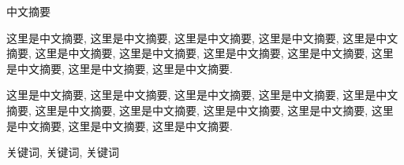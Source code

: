 \thispagestyle{plain}
{}

\centerline{\heiti 中文摘要}

\linespread{1.4} \bigskip

这里是中文摘要, 这里是中文摘要, 这里是中文摘要, 这里是中文摘要,
这里是中文摘要, 这里是中文摘要, 这里是中文摘要, 这里是中文摘要,
这里是中文摘要, 这里是中文摘要, 这里是中文摘要, 这里是中文摘要.

这里是中文摘要, 这里是中文摘要, 这里是中文摘要, 这里是中文摘要,
这里是中文摘要, 这里是中文摘要, 这里是中文摘要, 这里是中文摘要,
这里是中文摘要, 这里是中文摘要, 这里是中文摘要, 这里是中文摘要.

\bigskip

关键词, 关键词, 关键词
